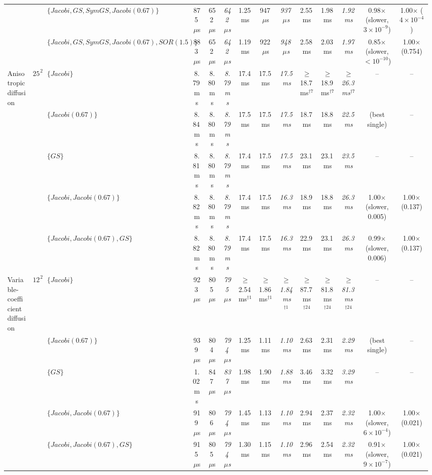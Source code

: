{\begin{tabular}{lllccccccccccc}
 &  & $\{Jacobi, GS, SymGS, Jacobi (0.67)\}$ & 875\,$\mu$s & 652\,$\mu$s & \textit{642\,$\mu$s} & 1.25\,ms & 947\,$\mu$s & \textit{937\,$\mu$s} & 2.55\,ms & 1.98\,ms & \textit{1.92\,ms} & 0.98$\times$ (slower, $3\times10^{-9}$) & 1.00$\times$ ($4\times10^{-4}$) \\
 &  & $\{Jacobi, GS, SymGS, Jacobi (0.67), SOR (1.5)\}$ & 883\,$\mu$s & 652\,$\mu$s & \textit{642\,$\mu$s} & 1.19\,ms & 922\,$\mu$s & \textit{948\,$\mu$s} & 2.58\,ms & 2.03\,ms & \textit{1.97\,ms} & 0.85$\times$ (slower, $<10^{-10}$) & 1.00$\times$ (0.754) \\
\midrule
Anisotropic diffusion & $256^2$ & $\{Jacobi\}$ & 8.79\,ms & 8.80\,ms & \textit{8.79\,ms} & 17.4\,ms & 17.5\,ms & \textit{17.5\,ms} & $\geq$18.7\,ms$^{\dagger 7}$ & $\geq$18.9\,ms$^{\dagger 7}$ & \textit{$\geq$26.3\,ms$^{\dagger 7}$} & -- & -- \\
 &  & $\{Jacobi (0.67)\}$ & 8.84\,ms & 8.80\,ms & \textit{8.79\,ms} & 17.5\,ms & 17.5\,ms & \textit{17.5\,ms} & 18.7\,ms & 18.8\,ms & \textit{22.5\,ms} & (best single) & -- \\
 &  & $\{GS\}$ & 8.81\,ms & 8.80\,ms & \textit{8.79\,ms} & 17.4\,ms & 17.5\,ms & \textit{17.5\,ms} & 23.1\,ms & 23.1\,ms & \textit{23.5\,ms} & -- & -- \\
 &  & $\{Jacobi, Jacobi (0.67)\}$ & 8.82\,ms & 8.80\,ms & \textit{8.79\,ms} & 17.4\,ms & 17.5\,ms & \textit{16.3\,ms} & 18.9\,ms & 18.8\,ms & \textit{26.3\,ms} & 1.00$\times$ (slower, 0.005) & 1.00$\times$ (0.137) \\
 &  & $\{Jacobi, Jacobi (0.67), GS\}$ & 8.82\,ms & 8.80\,ms & \textit{8.79\,ms} & 17.4\,ms & 17.5\,ms & \textit{16.3\,ms} & 22.9\,ms & 23.1\,ms & \textit{26.3\,ms} & 0.99$\times$ (slower, 0.006) & 1.00$\times$ (0.137) \\
\midrule
Variable-coefficient diffusion & $128^2$ & $\{Jacobi\}$ & 923\,$\mu$s & 805\,$\mu$s & \textit{795\,$\mu$s} & $\geq$2.54\,ms$^{\dagger 1}$ & $\geq$1.86\,ms$^{\dagger 1}$ & \textit{$\geq$1.84\,ms$^{\dagger 1}$} & $\geq$87.7\,ms$^{\dagger 24}$ & $\geq$81.8\,ms$^{\dagger 24}$ & \textit{$\geq$81.3\,ms$^{\dagger 24}$} & -- & -- \\
 &  & $\{Jacobi (0.67)\}$ & 939\,$\mu$s & 804\,$\mu$s & \textit{794\,$\mu$s} & 1.25\,ms & 1.11\,ms & \textit{1.10\,ms} & 2.63\,ms & 2.31\,ms & \textit{2.29\,ms} & (best single) & -- \\
 &  & $\{GS\}$ & 1.02\,ms & 847\,$\mu$s & \textit{837\,$\mu$s} & 1.98\,ms & 1.90\,ms & \textit{1.88\,ms} & 3.46\,ms & 3.32\,ms & \textit{3.29\,ms} & -- & -- \\
 &  & $\{Jacobi, Jacobi (0.67)\}$ & 919\,$\mu$s & 806\,$\mu$s & \textit{794\,$\mu$s} & 1.45\,ms & 1.13\,ms & \textit{1.10\,ms} & 2.94\,ms & 2.37\,ms & \textit{2.32\,ms} & 1.00$\times$ (slower, $6\times10^{-4}$) & 1.00$\times$ (0.021) \\
 &  & $\{Jacobi, Jacobi (0.67), GS\}$ & 915\,$\mu$s & 805\,$\mu$s & \textit{794\,$\mu$s} & 1.30\,ms & 1.15\,ms & \textit{1.10\,ms} & 2.96\,ms & 2.54\,ms & \textit{2.32\,ms} & 0.91$\times$ (slower, $9\times10^{-7}$) & 1.00$\times$ (0.021) \\
\bottomrule
\end{tabular}}
